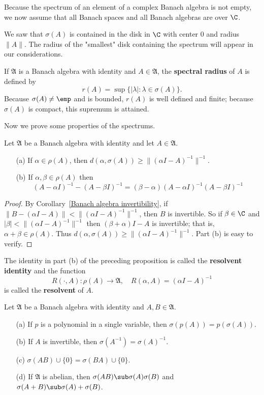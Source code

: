 Because the spectrum of an element of a complex Banach algebra is not empty, we now assume that all Banach spaces and all Banach algebras are over $\C$.\par
We saw that $\sigma(A)$ is contained in the disk in $\C$ with center $0$ and radius $\|A\|$. The radius of the "smallest" disk containing the spectrum will appear in our considerations.
\begin{definition}
If $\mathfrak{A}$ is a Banach algebra with identity and $A\in\mathfrak{A}$, the \textbf{spectral radius} of $A$ is defined by
\[r(A)=\sup\{|\lambda|:\lambda\in\sigma(A)\}.\]
Because $\sigma(A)\neq\emp$ and is bounded, $r(A)$ is well defined and finite; because $\sigma(A)$ is compact, this supremum is attained.
\end{definition}
Now we prove some properties of the spectrums.
\begin{proposition}
Let $\mathfrak{A}$ be a Banach algebra with identity and let $A\in\mathfrak{A}$.
\begin{itemize}
\item[(a)] If $\alpha\in\rho(A)$, then $d(\alpha,\sigma(A))\geq\|(\alpha I-A)^{-1}\|^{-1}$. 
\item[(b)] If $\alpha,\beta\in\rho(A)$ then
\[(A-\alpha I)^{-1}-(A-\beta I)^{-1}=(\beta-\alpha)(A-\alpha I)^{-1}(A-\beta I)^{-1}\] 
\end{itemize}
\end{proposition}
\begin{proof}
By Corollary~\ref{Banach algebra invertibility}, if $\|B-(\alpha I-A)\|<\|(\alpha I-A)^{-1}\|^{-1}$, then $B$ is invertible. So if $\beta\in\C$ and $|\beta|<\|(\alpha I-A)^{-1}\|^{-1}$ then $(\beta+\alpha)I-A$ is invertible; that is, $\alpha+\beta\in\rho(A)$. Thus $d(\alpha,\sigma(A))\geq\|(\alpha I-A)^{-1}\|^{-1}$. Part (b) is easy to verify.
\end{proof}
The identity in part (b) of the preceding proposition is called the \textbf{resolvent identity} and the function
\[R(\cdot,A):\rho(A)\to\mathfrak{A},\quad R(\alpha,A)=(\alpha I-A)^{-1}\] is called the \textbf{resolvent} of $A$.
\begin{proposition}\label{Banach algebra spectrum prop}
Let $\mathfrak{A}$ be a Banach algebra with identity and $A,B\in\mathfrak{A}$.
\begin{itemize}
\item[(a)] If $p$ is a polynomial in a single variable, then $\sigma(p(A))=p(\sigma(A))$.
\item[(b)] If $A$ is invertible, then $\sigma(A^{-1})=\sigma(A)^{-1}$.
\item[(c)] $\sigma(AB)\cup\{0\}=\sigma(BA)\cup\{0\}$.
\item[(d)] If $\mathfrak{A}$ is abelian, then $\sigma(AB)\sub\sigma(A)\sigma(B)$ and $\sigma(A+B)\sub\sigma(A)+\sigma(B)$.
\end{itemize}
\end{proposition}
